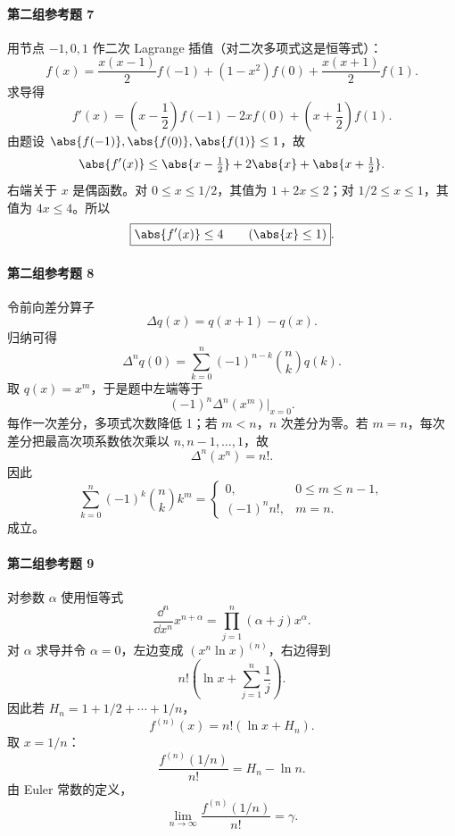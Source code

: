 \paragraph{第二组参考题 7}
\begin{xsolution}
用节点 $-1,0,1$ 作二次 Lagrange 插值（对二次多项式这是恒等式）：
\[
  f(x)=\frac{x(x-1)}2f(-1)+(1-x^2)f(0)+\frac{x(x+1)}2f(1).
\]
求导得
\[
  f'(x)=\left(x-\frac12\right)f(-1)-2xf(0)+\left(x+\frac12\right)f(1).
\]
由题设 $\abs{f(-1)},\abs{f(0)},\abs{f(1)}\le1$，故
\[
  \abs{f'(x)}\le\abs{x-\tfrac12}+2\abs{x}+\abs{x+\tfrac12}.
\]
右端关于 $x$ 是偶函数。对 $0\le x\le1/2$，其值为 $1+2x\le2$；对 $1/2\le x\le1$，其值为 $4x\le4$。所以
\[
  \boxed{\abs{f'(x)}\le4\qquad(\abs{x}\le1)}.
\]
\end{xsolution}

\paragraph{第二组参考题 8}
\begin{xsolution}
令前向差分算子
\[
  \Delta q(x)=q(x+1)-q(x).
\]
归纳可得
\[
  \Delta^n q(0)=\sum_{k=0}^n(-1)^{n-k}\binom nk q(k).
\]
取 $q(x)=x^m$，于是题中左端等于
\[
  (-1)^n\Delta^n(x^m)\big|_{x=0}.
\]
每作一次差分，多项式次数降低 1；若 $m<n$，$n$ 次差分为零。若 $m=n$，每次差分把最高次项系数依次乘以 $n,n-1,\ldots,1$，故
\[
  \Delta^n(x^n)=n!.
\]
因此
\[
  \boxed{
  \sum_{k=0}^n(-1)^k\binom nk k^m=
  \begin{cases}
    0,&0\le m\le n-1,\\
    (-1)^nn!,&m=n.
  \end{cases}}
\]
成立。
\end{xsolution}

\paragraph{第二组参考题 9}
\begin{xsolution}
对参数 $\alpha$ 使用恒等式
\[
  \frac{\dd^n}{\dd x^n}x^{n+\alpha}
  =\prod_{j=1}^n(\alpha+j)x^\alpha.
\]
对 $\alpha$ 求导并令 $\alpha=0$，左边变成 $(x^n\ln x)^{(n)}$，右边得到
\[
  n!\left(\ln x+\sum_{j=1}^n\frac1j\right).
\]
因此若 $H_n=1+1/2+\cdots+1/n$，
\[
  f^{(n)}(x)=n!(\ln x+H_n).
\]
取 $x=1/n$：
\[
  \frac{f^{(n)}(1/n)}{n!}=H_n-\ln n.
\]
由 Euler 常数的定义，
\[
  \boxed{\lim_{n\to\infty}\frac{f^{(n)}(1/n)}{n!}=\gamma}.
\]
\end{xsolution}

